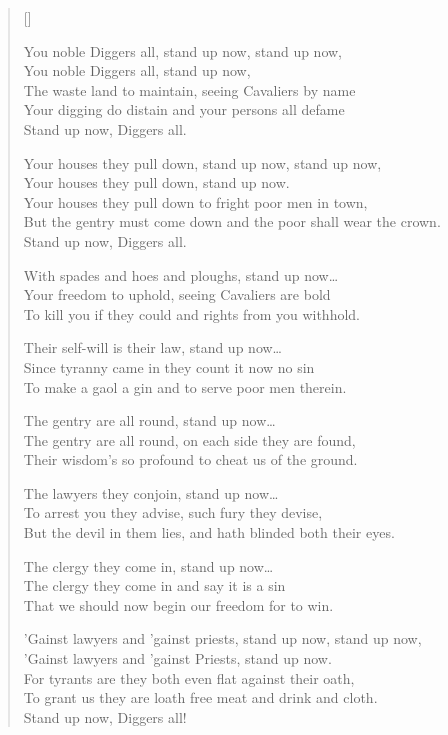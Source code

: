 \pagebreak
\settowidth{\versewidth}{Your houses they pull down to fright poor men in town,}
\begin{verse}[\versewidth]

You noble Diggers all, stand up now, stand up now,\\
You noble Diggers all, stand up now,\\
The waste land to maintain, seeing Cavaliers by name\\
Your digging do distain and your persons all defame\\
Stand up now, Diggers all.

Your houses they pull down, stand up now, stand up now,\\
Your houses they pull down, stand up now.\\
Your houses they pull down to fright poor men in town,\\
But the gentry must come down and the poor shall wear the crown.\\
Stand up now, Diggers all.

With spades and hoes and ploughs, stand up now\dots{}\\
Your freedom to uphold, seeing Cavaliers are bold\\
To kill you if they could and rights from you withhold.

Their self-will is their law, stand up now\dots{}\\
Since tyranny came in they count it now no sin\\
To make a gaol a gin and to serve poor men therein.

The gentry are all round, stand up now\dots{}\\
The gentry are all round, on each side they are found,\\
Their wisdom's so profound to cheat us of the ground.

The lawyers they conjoin, stand up now\dots{}\\
To arrest you they advise, such fury they devise,\\
But the devil in them lies, and hath blinded both their eyes.

The clergy they come in, stand up now\dots{}\\
The clergy they come in and say it is a sin\\
That we should now begin our freedom for to win.

'Gainst lawyers and 'gainst priests, stand up now, stand up now,\\
'Gainst lawyers and 'gainst Priests, stand up now.\\
For tyrants are they both even flat against their oath,\\
To grant us they are loath free meat and drink and cloth.\\
Stand up now, Diggers all!
\end{verse}

